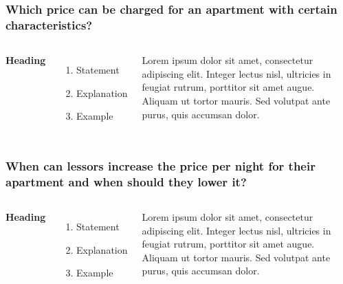 \documentclass{beamer}
\begin{document}

\begin{frame}
\frametitle{Which price can be charged for an apartment with certain characteristics?}
\begin{columns}[c] %

\textbf{Heading}
\begin{enumerate}
\item Statement
\item Explanation
\item Example
\end{enumerate}

Lorem ipsum dolor sit amet, consectetur adipiscing elit. Integer lectus nisl, ultricies in feugiat rutrum, porttitor sit amet augue. Aliquam ut tortor mauris. Sed volutpat ante purus, quis accumsan dolor.
\end{columns}
\end{frame}


\begin{frame}
\frametitle{When can lessors increase the price per night for their apartment and when should they lower it?}
\begin{columns}[c] %

\textbf{Heading}
\begin{enumerate}
\item Statement
\item Explanation
\item Example
\end{enumerate}

Lorem ipsum dolor sit amet, consectetur adipiscing elit. Integer lectus nisl, ultricies in feugiat rutrum, porttitor sit amet augue. Aliquam ut tortor mauris. Sed volutpat ante purus, quis accumsan dolor.
\end{columns}
\end{frame}

\end{document}
